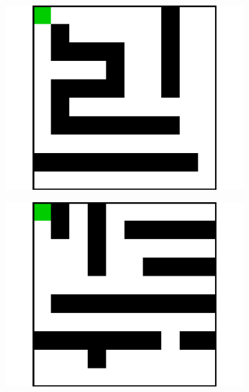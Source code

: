 \documentclass{article}
\begin{document}
\begin{figure}[t]
\begin{subfigure}[t]{0.18\textwidth}
    \includegraphics[width=\textwidth]{images/maze/maze7.pdf}
    \caption{}
  \end{subfigure}
  \begin{subfigure}[t]{0.18\textwidth}
    \includegraphics[width=\textwidth]{images/maze/maze8.pdf}
    \caption{}\label{fig:maze8}
  \end{subfigure}
  \begin{subfigure}[t]{0.18\textwidth}

\end{subfigure}
\end{figure}
\end{document}
